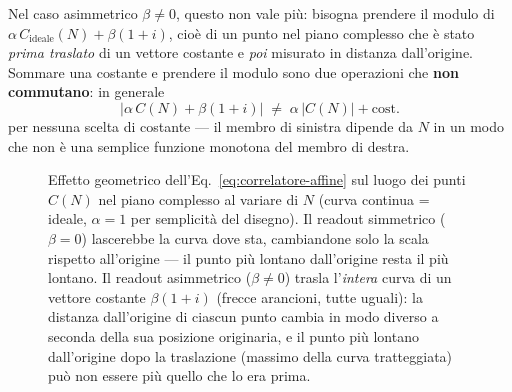 \documentclass[11pt,a4paper]{article}
\begin{document}
Nel caso asimmetrico $\beta\neq0$, questo non vale più: bisogna prendere
il modulo di $\alpha\,C_\text{ideale}(N)+\beta(1+i)$, cioè di un punto
nel piano complesso che è stato \emph{prima traslato} di un vettore
costante e \emph{poi} misurato in distanza dall'origine. Sommare una
costante e prendere il modulo sono due operazioni che \textbf{non
commutano}: in generale
\begin{equation}
\big|\alpha\,C(N)+\beta(1+i)\big| \;\neq\; \alpha\,\big|C(N)\big| + \text{cost.}
\end{equation}
per nessuna scelta di costante --- il membro di sinistra dipende da $N$
in un modo che non è una semplice funzione monotona del membro di destra.

\begin{figure}[htbp]
\centering
{}
\caption{Effetto geometrico dell'Eq.~\eqref{eq:correlatore-affine} sul
luogo dei punti $C(N)$ nel piano complesso al variare di $N$ (curva
continua = ideale, $\alpha=1$ per semplicità del disegno). Il readout
simmetrico ($\beta=0$) lascerebbe la curva dove sta, cambiandone solo la
scala rispetto all'origine --- il punto più lontano dall'origine resta
il più lontano. Il readout asimmetrico ($\beta\neq0$) trasla l'\emph{intera}
curva di un vettore costante $\beta(1+i)$ (frecce arancioni, tutte
uguali): la distanza dall'origine di ciascun punto cambia in modo diverso
a seconda della sua posizione originaria, e il punto più lontano
dall'origine dopo la traslazione (massimo della curva tratteggiata) può
non essere più quello che lo era prima.}
\label{fig:traslazione-correlatore}
\end{figure}
\end{document}
